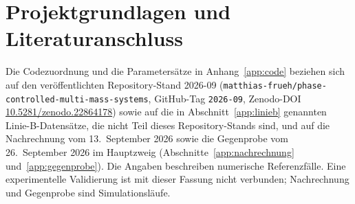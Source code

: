 \documentclass[11pt,a4paper]{article}
\begin{document}
\section{Projektgrundlagen und Literaturanschluss}\label{app:quellen}
Die Codezuordnung und die Parametersätze in Anhang~\ref{app:code} beziehen sich auf den veröffentlichten Repository-Stand 2026-09 (\texttt{matthias-frueh/phase-controlled-multi-mass-systems}, GitHub-Tag \texttt{2026-09}, Zenodo-DOI \href{https://doi.org/10.5281/zenodo.22864178}{10.5281/zenodo.22864178}) sowie auf die in Abschnitt~\ref{app:linieb} genannten Linie-B-Datensätze, die nicht Teil dieses Repository-Stands sind, und auf die Nachrechnung vom 13.~September 2026 sowie die Gegenprobe vom 26.~September 2026 im Hauptzweig (Abschnitte~\ref{app:nachrechnung} und~\ref{app:gegenprobe}). Die Angaben beschreiben numerische Referenzfälle. Eine experimentelle Validierung ist mit dieser Fassung nicht verbunden; Nachrechnung und Gegenprobe sind Simulationsläufe.
\end{document}
